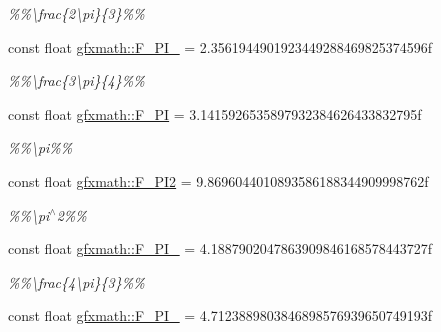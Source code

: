 \begin{DoxyCompactItemize}
\begin{DoxyCompactList}\small\item\em \%\%\textbackslash{}frac\{2\textbackslash{}pi\}\{3\}\%\% \end{DoxyCompactList}\item 
\hypertarget{group___scalar_math_consts_gadf574e6f68c342910912fe6689bcec97}{}const float \hyperlink{group___scalar_math_consts_gadf574e6f68c342910912fe6689bcec97}{gfxmath\+::\+F\+\_\+P\+I\+\_} = 2.\+3561944901923449288469825374596f\label{group___scalar_math_consts_gadf574e6f68c342910912fe6689bcec97}

\begin{DoxyCompactList}\small\item\em \%\%\textbackslash{}frac\{3\textbackslash{}pi\}\{4\}\%\% \end{DoxyCompactList}\item 
\hypertarget{group___scalar_math_consts_ga2c19b1c00458d0f6bd454617b337d468}{}const float \hyperlink{group___scalar_math_consts_ga2c19b1c00458d0f6bd454617b337d468}{gfxmath\+::\+F\+\_\+\+P\+I} = 3.\+1415926535897932384626433832795f\label{group___scalar_math_consts_ga2c19b1c00458d0f6bd454617b337d468}

\begin{DoxyCompactList}\small\item\em \%\%\textbackslash{}pi\%\% \end{DoxyCompactList}\item 
\hypertarget{group___scalar_math_consts_ga4102d0514ecc68aeb12772a49c507288}{}const float \hyperlink{group___scalar_math_consts_ga4102d0514ecc68aeb12772a49c507288}{gfxmath\+::\+F\+\_\+\+P\+I2} = 9.\+8696044010893586188344909998762f\label{group___scalar_math_consts_ga4102d0514ecc68aeb12772a49c507288}

\begin{DoxyCompactList}\small\item\em \%\%\textbackslash{}pi$^\wedge$2\%\% \end{DoxyCompactList}\item 
\hypertarget{group___scalar_math_consts_ga557a3cd249de463476b850a3e726f370}{}const float \hyperlink{group___scalar_math_consts_ga557a3cd249de463476b850a3e726f370}{gfxmath\+::\+F\+\_\+P\+I\+\_} = 4.\+1887902047863909846168578443727f\label{group___scalar_math_consts_ga557a3cd249de463476b850a3e726f370}

\begin{DoxyCompactList}\small\item\em \%\%\textbackslash{}frac\{4\textbackslash{}pi\}\{3\}\%\% \end{DoxyCompactList}\item 
\hypertarget{group___scalar_math_consts_ga868af3e091584d5352e3b00e1503a650}{}const float \hyperlink{group___scalar_math_consts_ga868af3e091584d5352e3b00e1503a650}{gfxmath\+::\+F\+\_\+P\+I\+\_} = 4.\+7123889803846898576939650749193f\label{group___scalar_math_consts_ga868af3e091584d5352e3b00e1503a650}


\end{DoxyCompactItemize}
